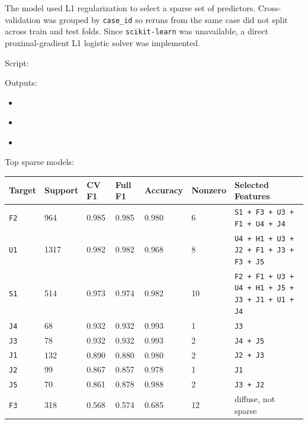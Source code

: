 \documentclass[11pt]{article}
\begin{document}
The model used L1 regularization to select a sparse set of predictors. Cross-validation was grouped by \texttt{case\_id} so reruns from the same case did not split across train and test folds. Since \texttt{scikit-learn} was unavailable, a direct proximal-gradient L1 logistic solver was implemented.

Script:

\href{../scripts/fit_l1_rule_models.py}{}

Outputs:

\begin{itemize}[leftmargin=1.5em]
  \item \href{../results/l1_logistic_rule_models_reruns.csv}{}
  \item \href{../results/l1_logistic_rule_coefficients_reruns.csv}{}
  \item \href{../results/l1_logistic_cv_path_reruns.csv}{}
\end{itemize}

Top sparse models:

\begingroup
\small
\begin{longtable}{L{0.09\textwidth} R{0.09\textwidth} R{0.08\textwidth} R{0.08\textwidth} R{0.08\textwidth} R{0.08\textwidth} L{0.35\textwidth}}
\toprule
Target & Support & CV F1 & Full F1 & Accuracy & Nonzero & Selected Features \\
\midrule
\endhead
\texttt{F2} & 964 & 0.985 & 0.985 & 0.980 & 6 & \texttt{S1 + F3 + U3 + F1 + U4 + J4} \\
\texttt{U1} & 1317 & 0.982 & 0.982 & 0.968 & 8 & \texttt{U4 + H1 + U3 + J2 + F1 + J3 + F3 + J5} \\
\texttt{S1} & 514 & 0.973 & 0.974 & 0.982 & 10 & \texttt{F2 + F1 + U3 + U4 + H1 + J5 + J3 + J1 + U1 + J4} \\
\texttt{J4} & 68 & 0.932 & 0.932 & 0.993 & 1 & \texttt{J3} \\
\texttt{J3} & 78 & 0.932 & 0.932 & 0.993 & 2 & \texttt{J4 + J5} \\
\texttt{J1} & 132 & 0.890 & 0.880 & 0.980 & 2 & \texttt{J2 + J3} \\
\texttt{J2} & 99 & 0.867 & 0.857 & 0.978 & 1 & \texttt{J1} \\
\texttt{J5} & 70 & 0.861 & 0.878 & 0.988 & 2 & \texttt{J3 + J2} \\
\texttt{F3} & 318 & 0.568 & 0.574 & 0.685 & 12 & diffuse, not sparse \\
\bottomrule
\end{longtable}
\endgroup
\end{document}
